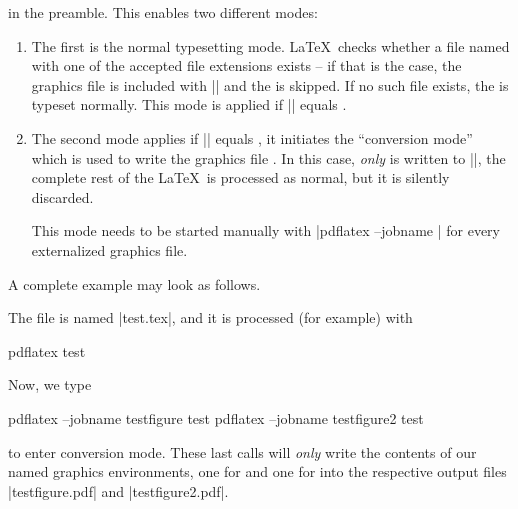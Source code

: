 {\noindent in the preamble. This enables two different modes: 
\begin{enumerate}
	\item The first is the normal typesetting mode. \LaTeX\ checks whether a file named  with one of the accepted file extensions exists -- if that is the case, the graphics file is included with |\pgfimage| and the  is skipped. If no such file exists, the  is typeset normally. This mode is applied if |\jobname| equals .
	\item The second mode applies if |\jobname| equals , it initiates the ``conversion mode'' which is used to write the graphics file . In this case, \emph{only}  is written to |\jobname|, the complete rest of the \LaTeX\ is processed as normal, but it is silently discarded.

	This mode needs to be started manually with |pdflatex --jobname | for every externalized graphics file.
\end{enumerate}
A complete example may look as follows.
\noindent The file is named |test.tex|, and it is processed (for example) with
\begin{codeexample}
pdflatex test	
\end{codeexample}
\noindent Now, we type
\begin{codeexample}
pdflatex --jobname testfigure test	
pdflatex --jobname testfigure2 test	
\end{codeexample}
\noindent to enter conversion mode. These last calls will \emph{only} write the contents of our named graphics environments, one for  and one for  into the respective output files |testfigure.pdf| and |testfigure2.pdf|.

}

